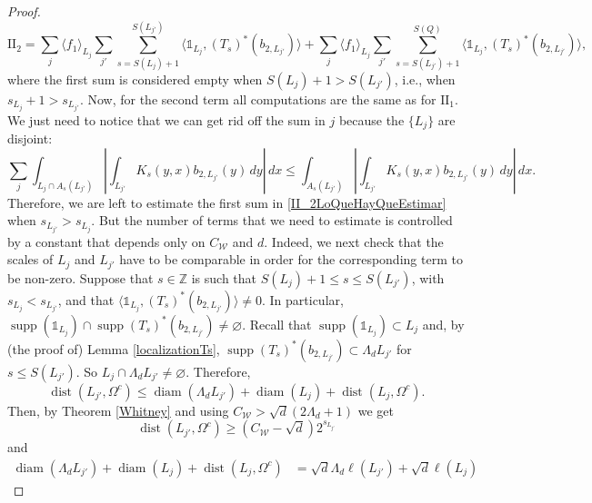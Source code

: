 \documentclass[12pt]{amsart}
\newcommand{\Z}{\mathbb{Z}}
\newcommand{\diam}[1]{\operatorname{diam}\left(#1\right) }
\newcommand{\supp}[1]{\operatorname{supp}\left(#1\right) }
\newcommand{\dist}[1]{\operatorname{dist}\left(#1\right) }
\newcommand{\one}{\mathds{1}}
\theoremstyle{plain}
\theoremstyle{definition} %
\numberwithin{equation}{section}
\begin{document}
\begin{proof}
\begin{equation}
\mathrm{II}_2
=
\sum_{j}\langle f_1\rangle_{L_j}\sum_{j'}\sum_{s=S(L_j)+1}^{S(L_{j'})}\langle \one_{L_j},(T_s)^{\ast}(b_{2,L_{j'}})\rangle
+
\sum_{j}\langle f_1\rangle_{L_j}\sum_{j'}\sum_{s=S(L_{j'})+1}^{S(Q)}\langle \one_{L_j},(T_s)^{\ast}(b_{2,L_{j'}})\rangle,    
\end{equation}
where the first sum is considered empty when $S(L_{j})+1>S(L_{j'})$, i.e., when $s_{L_j}+1>s_{L_{j'}}$. Now, for the second term all computations are the same as for $\mathrm{II}_1$. We just need to notice that we can get rid off the sum in $j$ because the $\{L_j\}$ are disjoint:
\[
\sum_j\int_{L_j\cap A_s(L_{j'})}\left|\int_{L_{j'}}K_s(y,x)b_{2,L_{j'}}(y)\, dy\right|\, dx
\leq %
\int_{A_s(L_{j'})}\left|\int_{L_{j'}}K_s(y,x)b_{2,L_{j'}}(y)\, dy\right|\, dx.
\]
Therefore, we are left to estimate the first sum in \eqref{II_2LoQueHayQueEstimar} when $s_{L_{j'}}>s_{L_j}$.
But the number of terms that we need to estimate is controlled by a constant that depends only on $C_{\mathcal{W}}$ and $d$. Indeed, we next check that the scales of $L_j$ and $L_{j'}$ have to be comparable in order for the corresponding term to be non-zero. Suppose that $s\in \Z$ is such that $S(L_j)+1\leq s\leq S(L_{j'})$, with $s_{L_j}<s_{L_{j'}}$, and that $\langle \one_{L_j},(T_s)^{\ast}(b_{2,L_{j'}})\rangle\neq 0$.
In particular, $\operatorname{supp}(\one_{L_j})\cap\operatorname{supp}(T_s)^{\ast}(b_{2,L_{j'}})\neq \varnothing.$
Recall that $\supp{\one_{L_j}}\subset L_j$ and, by (the proof of) Lemma \ref{localizationTs}, $\operatorname{supp}(T_s)^{\ast}(b_{2,L_{j'}})\subset\Lambda_dL_{j'}$ for $s\leq S(L_{j'})$.
So $L_j\cap \Lambda_dL_{j'}\neq\varnothing$. Therefore,
\[
\dist{L_{j'},\Omega^c}
\leq 
\diam{\Lambda_dL_{j'}}
+
\diam{L_{j}}
+
\dist{L_j,\Omega^c}.    
\]
Then, by Theorem \ref{Whitney} and using $C_{\mathcal{W}}>\sqrt{d}(2\Lambda_d+1)$ we get
\[
\dist{L_{j'},\Omega^c}
\geq 
(C_{\mathcal{W}}-\sqrt{d})2^{s_{L_{j'}}}
\]
and
\begin{align*}
\diam{\Lambda_dL_{j'}}
+
\diam{L_j}
+
\dist{L_{j},\Omega^c}
&=
\sqrt{d}\Lambda_d\ell(L_{j'})
+
\sqrt{d}\ell(L_j)

\end{align*}
\end{proof}
\end{document}
